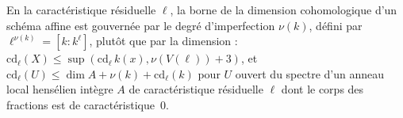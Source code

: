 \begin{encadre}
\begin{conjecture*}
En la caractéristique résiduelle $\ell$, la borne de la dimension cohomologique d'un schéma affine est gouvernée par le degré d'imperfection $\nu(k)$, défini par $\ell^{\nu(k)} = [k : k^\ell]$, plutôt que par la dimension : $\mathrm{cd}_\ell(X) \leq \sup(\mathrm{cd}_\ell\, k(x), \nu(V(\ell)) + 3)$, et $\mathrm{cd}_\ell(U) \leq \dim A + \nu(k) + \mathrm{cd}_\ell(k)$ pour $U$ ouvert du spectre d'un anneau local hensélien intègre $A$ de caractéristique résiduelle $\ell$ dont le corps des fractions est de caractéristique~$0$.
\end{conjecture*}
\end{encadre}
